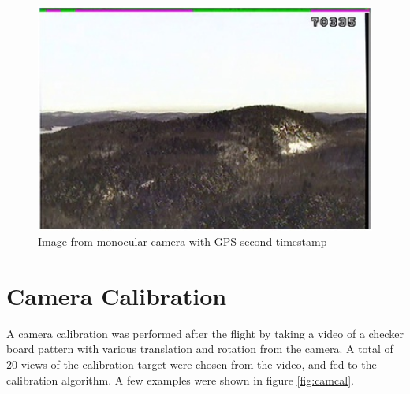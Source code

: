 \begin{figure}[h]
  \centering
  \includegraphics[width=12cm,keepaspectratio=true]{./Figures/video_snapshot.jpg}
  \caption{Image from monocular camera with GPS second timestamp}
  \label{fig:video_snapshot}
\end{figure}

\FloatBarrier

\section{Camera Calibration}\label{sec:camcal}
A camera calibration was performed after the flight by taking a video
of a checker board pattern with various translation and rotation from
the camera. A total of 20 views of the calibration target were chosen
from the video, and fed to the calibration algorithm. A few examples
were shown in figure \ref{fig:camcal}.

